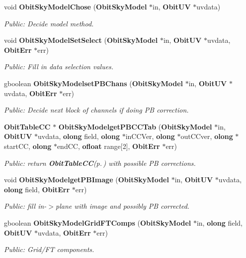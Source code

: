 \begin{CompactItemize}
void {\bf Obit\-Sky\-Model\-Chose} ({\bf Obit\-Sky\-Model} $\ast$in, {\bf Obit\-UV} $\ast$uvdata)
\begin{CompactList}\small\item\em Public: Decide model method. \item\end{CompactList}\item 
void {\bf Obit\-Sky\-Model\-Set\-Select} ({\bf Obit\-Sky\-Model} $\ast$in, {\bf Obit\-UV} $\ast$uvdata, {\bf Obit\-Err} $\ast$err)
\begin{CompactList}\small\item\em Public: Fill in data selection values. \item\end{CompactList}\item 
gboolean {\bf Obit\-Sky\-Modelset\-PBChans} ({\bf Obit\-Sky\-Model} $\ast$in, {\bf Obit\-UV} $\ast$uvdata, {\bf Obit\-Err} $\ast$err)
\begin{CompactList}\small\item\em Public: Decide next block of channels if doing PB correction. \item\end{CompactList}\item 
{\bf Obit\-Table\-CC} $\ast$ {\bf Obit\-Sky\-Modelget\-PBCCTab} ({\bf Obit\-Sky\-Model} $\ast$in, {\bf Obit\-UV} $\ast$uvdata, {\bf olong} field, {\bf olong} $\ast$in\-CCVer, {\bf olong} $\ast$out\-CCver, {\bf olong} $\ast$start\-CC, {\bf olong} $\ast$end\-CC, {\bf ofloat} range[2], {\bf Obit\-Err} $\ast$err)
\begin{CompactList}\small\item\em Public: return {\bf Obit\-Table\-CC}{\rm (p.\,\pageref{structObitTableCC})} with possible PB corrections. \item\end{CompactList}\item 
void {\bf Obit\-Sky\-Modelget\-PBImage} ({\bf Obit\-Sky\-Model} $\ast$in, {\bf Obit\-UV} $\ast$uvdata, {\bf olong} field, {\bf Obit\-Err} $\ast$err)
\begin{CompactList}\small\item\em Public: fill in-$>$plane with image and possibly PB corrected. \item\end{CompactList}\item 
gboolean {\bf Obit\-Sky\-Model\-Grid\-FTComps} ({\bf Obit\-Sky\-Model} $\ast$in, {\bf olong} field, {\bf Obit\-UV} $\ast$uvdata, {\bf Obit\-Err} $\ast$err)
\begin{CompactList}\small\item\em Public: Grid/FT components. \item\end{CompactList}\item 

\end{CompactItemize}
